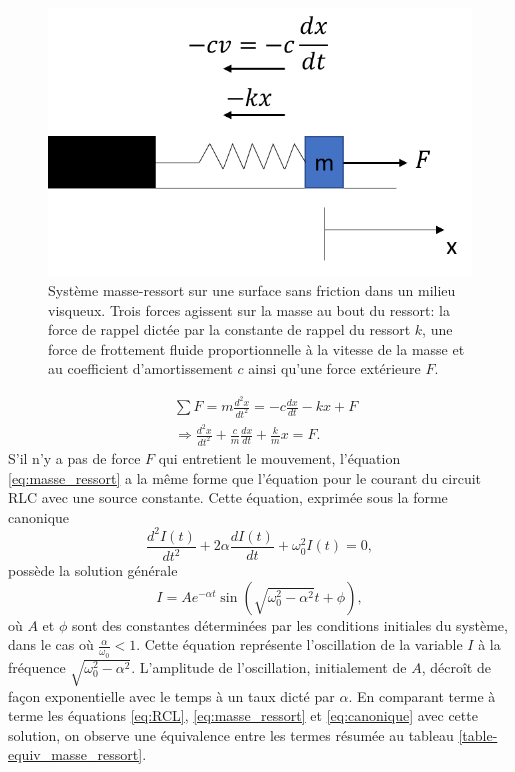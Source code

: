\documentclass[canadien,12pt,oneside,letterpaper]{article}
\begin{document}
\begin{figure}[h]
    \centering
    \includegraphics[]{Labos-Complements/Lab08/masse_ressort.png}
    \caption{\label{systeme_masse_ressort}Système masse-ressort sur une surface sans friction dans un milieu visqueux. Trois forces agissent sur la masse au bout du ressort: la force de rappel dictée par la constante de rappel du ressort $k$, une force de frottement fluide proportionnelle à la vitesse de la masse et au coefficient d'amortissement $c$ ainsi qu'une force extérieure $F$.}
    \label{fig:OF}
\end{figure}
\begin{equation}\label{eq:masse_ressort}
    \begin{split}
      &\sum F = m\frac{d^2x}{dt^2} = -c\frac{dx}{dt}-kx+F \\
      &\Rightarrow \frac{d^2x}{dt^2}+\frac{c}{m}\frac{dx}{dt}+\frac{k}{m}x = F.
    \end{split}
\end{equation}
S'il n'y a pas de force $F$ qui entretient le mouvement, l'équation \ref{eq:masse_ressort} a la même forme que l'équation pour le courant du circuit RLC avec une source constante. Cette équation, exprimée sous la forme canonique
\begin{equation}\label{eq:canonique}
    \frac{d^2I(t)}{dt^2}+2\alpha\frac{dI(t)}{dt}+\omega_0^2I(t) = 0,
\end{equation}
possède la solution générale
\begin{equation}\label{eq:sol_gen}
   I = Ae^{-\alpha t}\sin\left(\sqrt{\omega_0^2-\alpha^2}t+\phi\right), 
\end{equation}
où $A$ et $\phi$ sont des constantes déterminées par les conditions initiales du système, dans le cas où $\frac{\alpha}{\omega_0}<1$. Cette équation représente l'oscillation de la variable $I$ à la fréquence $\sqrt{\omega_0^2-\alpha^2}$. L'amplitude de l'oscillation, initialement de $A$, décroît de façon exponentielle avec le temps à un taux dicté par $\alpha$. En comparant terme à terme les équations \ref{eq:RCL}, \ref{eq:masse_ressort} et \ref{eq:canonique} avec cette solution, on observe une équivalence entre les termes résumée au tableau \ref{table-equiv_masse_ressort}.  
\end{document}
